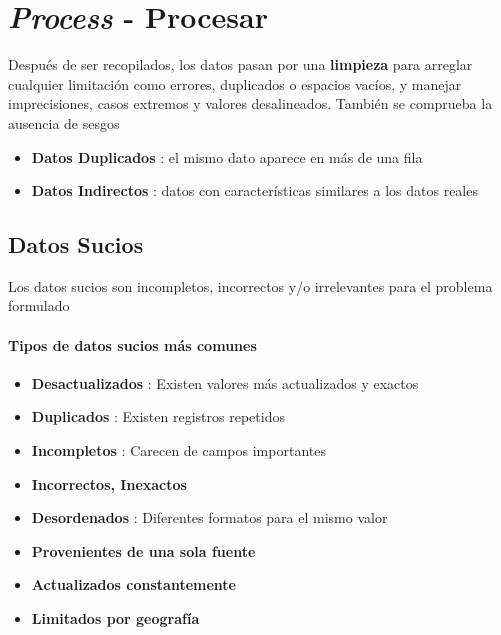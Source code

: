 

\section{\textit{Process} - Procesar}
Después de ser recopilados, los datos pasan por una \textbf{limpieza} para arreglar cualquier limitación como errores, duplicados o espacios vacíos, y manejar imprecisiones, casos extremos y valores desalineados. También se comprueba la ausencia de sesgos
\begin{itemize}
    \item {\textbf{Datos Duplicados} : el mismo dato aparece en más de una fila}
    \item {\textbf{Datos Indirectos} : datos con características similares a los datos reales}
\end{itemize}

\subsection{Datos Sucios}
Los datos sucios son incompletos, incorrectos y/o irrelevantes para el problema formulado
\paragraph{Tipos de datos sucios más comunes}
\begin{itemize}
    \item {\textbf{Desactualizados} : Existen valores más actualizados y exactos}
    \item {\textbf{Duplicados} : Existen registros repetidos}
    \item {\textbf{Incompletos} : Carecen de campos importantes}
    \item {\textbf{Incorrectos, Inexactos}}
    \item {\textbf{Desordenados} : Diferentes formatos para el mismo valor}
    \item {\textbf{Provenientes de una sola fuente}}
    \item {\textbf{Actualizados constantemente}}
    \item {\textbf{Limitados por geografía}}
\end{itemize}

